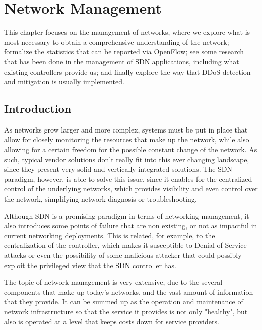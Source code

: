 \chapter{Network Management} \label{chap:nm} %

\par This chapter focuses on the management of networks, where we explore what is most necessary to obtain a comprehensive understanding of the network; formalize the statistics that can be reported via OpenFlow; see some 
research that has been done in the management of SDN applications, including what existing controllers provide us; and finally explore the way that DDoS detection and mitigation is usually implemented.

\section {Introduction}

\par As networks grow larger and more complex, systems must be put in place that allow for closely monitoring the resources that make up the network, while also allowing for a certain freedom for the possible constant change of the 
network. As such, typical vendor solutions don't really fit into this ever changing landscape, since they present very solid and vertically integrated solutions. The SDN paradigm, however, is able to solve this issue, since it 
enables for the centralized control of the underlying networks, which provides visibility and even control over the network, simplifying network diagnosis or troubleshooting. 
\par Although SDN is a promising paradigm in terms of networking management, it also introduces some points of failure that are non existing, or not as impactful in current networking deployments. This is related, for example,
to the centralization of the controller, which makes it susceptible to Denial-of-Service attacks or even the possibility of some malicious attacker that could possibly exploit the privileged view that the SDN controller has.
\par The topic of network management is very extensive, due to the several components that make up today's networks, and the vast amount of information that they provide. It can be summed up as the operation and maintenance 
of network infrastructure so that the service it provides is not only "healthy", but also is operated at a level that keeps costs down for service providers. 

